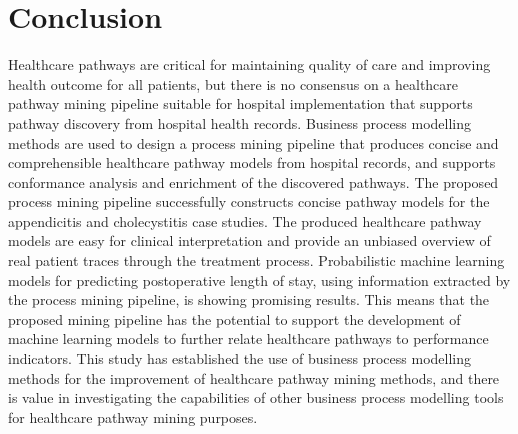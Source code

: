 \section{Conclusion}
Healthcare pathways are critical for maintaining quality of care and
improving health outcome for all patients, but there is no consensus
on a healthcare pathway mining pipeline suitable for hospital
implementation that supports pathway discovery from hospital health
records.
Business process modelling methods are used to design a process mining
pipeline that produces concise and comprehensible healthcare pathway
models from hospital records, and supports conformance analysis and
enrichment of the discovered pathways.
The proposed process mining pipeline successfully constructs concise
pathway models for the appendicitis and cholecystitis case studies.
The produced healthcare pathway models are easy for clinical
interpretation and provide an unbiased overview of real patient traces
through the treatment process.
Probabilistic machine learning models for predicting postoperative
length of stay, using information extracted by the process mining
pipeline, is showing promising results.
This means that the proposed mining pipeline has the potential to
support the development of machine learning models to further relate
healthcare pathways to performance indicators.
This study has established the use of business process modelling methods for the improvement of healthcare pathway mining methods, and there is value in investigating the capabilities of other business process modelling tools for healthcare pathway mining purposes.

